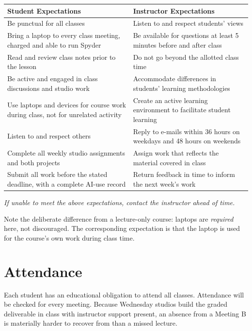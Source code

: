 \documentclass[11pt]{article}
\begin{document}
\begin{center}
\renewcommand{\arraystretch}{1.18}
\begin{tabularx}{\textwidth}{@{}>{\RaggedRight}X @{\hspace{1.2em}} >{\RaggedRight}X@{}}
\toprule
\textbf{Student Expectations} & \textbf{Instructor Expectations} \\
\midrule
Be punctual for all classes
  & Listen to and respect students' views \\
Bring a laptop to every class meeting, charged and able to run Spyder
  & Be available for questions at least 5 minutes before and after class \\
Read and review class notes prior to the lesson
  & Do not go beyond the allotted class time \\
Be active and engaged in class discussions and studio work
  & Accommodate differences in students' learning methodologies \\
Use laptops and devices for course work during class, not for unrelated activity
  & Create an active learning environment to facilitate student learning \\
Listen to and respect others
  & Reply to e-mails within 36 hours on weekdays and 48 hours on weekends \\
Complete all weekly studio assignments and both projects
  & Assign work that reflects the material covered in class \\
Submit all work before the stated deadline, with a complete AI-use record
  & Return feedback in time to inform the next week's work \\
\bottomrule
\end{tabularx}
\end{center}

\noindent\textit{If unable to meet the above expectations, contact the instructor ahead of
time.}

Note the deliberate difference from a lecture-only course: laptops are \emph{required} here,
not discouraged. The corresponding expectation is that the laptop is used for the course's own
work during class time.

\section{Attendance}

Each student has an educational obligation to attend all classes. Attendance will be checked
for every meeting. Because Wednesday studios build the graded deliverable in class with
instructor support present, an absence from a Meeting B is materially harder to recover from
than a missed lecture.
\end{document}
